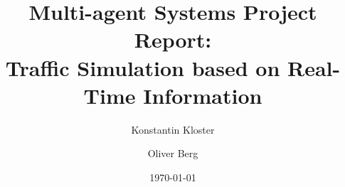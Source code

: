 \documentclass[10pt, oneside]{article}
\title{Multi-agent Systems Project Report: \\
    Traffic Simulation based on Real-Time Information}
\author[]{Konstantin Kloster}
\author[]{Oliver Berg}
\affil[1]{Technical University Kaiserslautern}
\date{\today}
\begin{document}
\maketitle



\begin{abstract}
    \lipsum[1]
\end{abstract}

\tableofcontents

\newpage



\newpage



\end{document}
